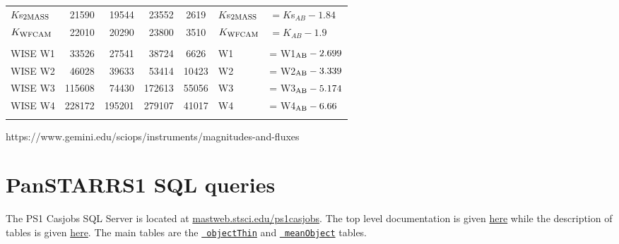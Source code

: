 \documentclass[usenatbib]{mnras}
\begin{document}
\begin{table*}
\begin{center}
\begin{tabular}{l r r r  c l l}
      $K$s$_{\rm 2MASS}$     &   21590    & 	19544  &   23552        &   2619      & $K$s$_{\rm 2MASS}$      & $ = K$s$_{AB} -  1.84  $          \\ 
      $K_{\rm WFCAM}$     &    22010     &    20290 &    23800         &   3510          & $K_{\rm WFCAM}$     & $ = K_{AB} - 1.9  $          \\ 
      &&&&&&\\
      WISE W1               &    33526    &    27541  &    38724   &    6626    & W1                        &   = W1$_{\rm AB} - 2.699$ \\
      WISE W2               &    46028    &    39633  &    53414   &  10423    & W2                        &   = W2$_{\rm AB} - 3.339$ \\
      WISE W3               &  115608    &    74430  &  172613   &  55056    & W3                        &   = W3$_{\rm AB} - 5.174$ \\
      WISE W4               &  228172    &  195201  &  279107   &  41017    & W4                        &   = W4$_{\rm AB} - 6.66$ \\
      \hline
      \hline
      \label{tab:filter_details}
    \end{tabular}
     \end{center}
\end{table*}
https://www.gemini.edu/sciops/instruments/magnitudes-and-fluxes





\section{PanSTARRS1 SQL queries}\label{sec:PS1_SQL}
The PS1 Casjobs SQL Server is located at
\href{http://mastweb.stsci.edu/ps1casjobs}{mastweb.stsci.edu/ps1casjobs}.
The top level documentation is given
\href{https://outerspace.stsci.edu/display/PANSTARRS/PS1+Source+extraction+and+catalogs}{here}
while the description of tables is given
\href{https://outerspace.stsci.edu/display/PANSTARRS/PS1+Source+extraction+and+catalogs#PS1Sourceextractionandcatalogs}{here}. The
main tables are the
\href{https://outerspace.stsci.edu/display/PANSTARRS/PS1+ObjectThin+table+fields}{{\tt
objectThin}} and
\href{https://outerspace.stsci.edu/display/PANSTARRS/PS1+MeanObject+table+fields}{{\tt
meanObject}} tables.
\end{document}
